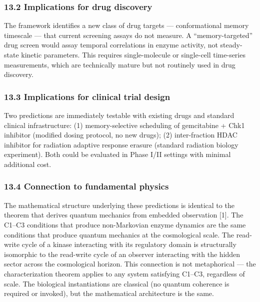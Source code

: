 \documentclass[
]{article}
\begin{document}
\hypertarget{implications-for-drug-discovery}{%
\subsubsection{13.2 Implications for drug
discovery}\label{implications-for-drug-discovery}}

The framework identifies a new class of drug targets --- conformational
memory timescale --- that current screening assays do not measure. A
``memory-targeted'' drug screen would assay temporal correlations in
enzyme activity, not steady-state kinetic parameters. This requires
single-molecule or single-cell time-series measurements, which are
technically mature but not routinely used in drug discovery.

\hypertarget{implications-for-clinical-trial-design}{%
\subsubsection{13.3 Implications for clinical trial
design}\label{implications-for-clinical-trial-design}}

Two predictions are immediately testable with existing drugs and
standard clinical infrastructure: (1) memory-selective scheduling of
gemcitabine + Chk1 inhibitor (modified dosing protocol, no new drugs);
(2) inter-fraction HDAC inhibitor for radiation adaptive response
erasure (standard radiation biology experiment). Both could be evaluated
in Phase I/II settings with minimal additional cost.

\hypertarget{connection-to-fundamental-physics}{%
\subsubsection{13.4 Connection to fundamental
physics}\label{connection-to-fundamental-physics}}

The mathematical structure underlying these predictions is identical to
the theorem that derives quantum mechanics from embedded observation
{[}1{]}. The C1--C3 conditions that produce non-Markovian enzyme
dynamics are the same conditions that produce quantum mechanics at the
cosmological scale. The read-write cycle of a kinase interacting with
its regulatory domain is structurally isomorphic to the read-write cycle
of an observer interacting with the hidden sector across the
cosmological horizon. This connection is not metaphorical --- the
characterization theorem applies to any system satisfying C1--C3,
regardless of scale. The biological instantiations are classical (no
quantum coherence is required or invoked), but the mathematical
architecture is the same.
\end{document}
